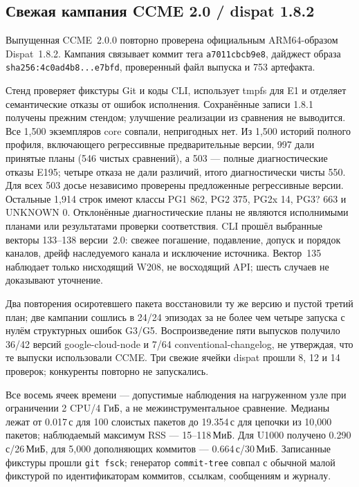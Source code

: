 \documentclass[sigconf,nonacm]{acmart}
\theoremstyle{acmplain}
\theoremstyle{acmdefinition}
\theoremstyle{acmplain}
\newcommand{\code}[1]{\texttt{#1}}
\begin{document}
\subsection{Свежая кампания CCME 2.0 / dispat 1.8.2}
\label{sec:eval:fresh}

Выпущенная CCME~2.0.0 повторно проверена официальным ARM64-образом
Dispat~1.8.2. Кампания связывает коммит тега \code{a7011cbcb9e8}, дайджест
образа \code{sha256:4c0ad4b8...e7bfd}, проверенный файл выпуска и 753 артефакта.

Стенд проверяет фикстуры Git и коды CLI, использует tmpfs для E1 и отделяет
семантические отказы от ошибок исполнения. Сохранённые записи 1.8.1 получены
прежним стендом; улучшение реализации из сравнения не выводится. Все 1{,}500 экземпляров core совпали,
непригодных нет. Из 1{,}500 историй полного профиля, включающего
регрессивные предварительные версии, 997
дали принятые планы (546 чистых сравнений), а 503 --- полные диагностические
отказы E195; четыре отказа не дали различий, итого диагностически чисты 550.
Для всех 503 досье независимо проверены предложенные регрессивные версии.
Остальные 1{,}914 строк имеют классы PG1 862, PG2 375, PG2x 14, PG3? 663 и
UNKNOWN 0. Отклонённые диагностические планы не являются исполнимыми планами
или результатами проверки соответствия. CLI прошёл выбранные векторы 133--138 версии~2.0: свежее
погашение, подавление, допуск и порядок каналов, дрейф наследуемого канала и
исключение источника. Вектор~135 наблюдает только нисходящий W208, не
восходящий API; шесть случаев не доказывают уточнение.

Два повторения осиротевшего пакета восстановили ту же версию и пустой третий
план; две кампании сошлись в 24/24 эпизодах за не более чем четыре запуска с
нулём структурных ошибок G3/G5. Воспроизведение пяти выпусков получило 36/42
версий google-cloud-node и 7/64 conventional-changelog, не утверждая, что те
выпуски использовали CCME. Три свежие ячейки dispat прошли 8, 12 и 14 проверок; конкуренты
повторно не запускались.

Все восемь ячеек времени --- допустимые наблюдения на нагруженном узле при
ограничении 2 CPU/4 ГиБ, а не межинструментальное сравнение. Медианы лежат от
0.017\,с для 100 слоистых пакетов до 19.354\,с для цепочки из 10{,}000 пакетов;
наблюдаемый максимум RSS --- 15--118\,МиБ. Для U1000 получено
0.290\,с/26\,МиБ, для 5{,}000 дополняющих коммитов --- 0.664\,с/30\,МиБ.
Записанные фикстуры прошли \code{git fsck}; генератор \code{commit-tree}
совпал с обычной малой фикстурой по идентификаторам коммитов, ссылкам,
сообщениям и журналу.
\end{document}
